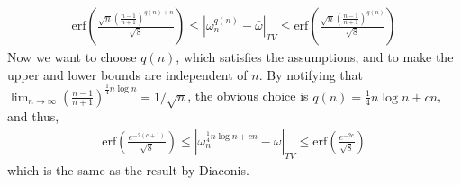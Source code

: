 \documentclass{article}
\begin{document}
\begin{eqnarray}
 \text{erf}\left(\frac{\sqrt{n}\left(\frac{n-1}{n+1} \right)^{q(n)+n}}{\sqrt{8}}\right) 
 \le |\omega_n^{q(n)}-\bar{\omega}|_{TV}
 \le \text{erf}\left(\frac{\sqrt{n}\left(\frac{n-1}{n+1} \right)^{q(n)}}{\sqrt{8}}\right)
\end{eqnarray}
Now we want to choose $q(n)$, which satisfies the assumptions, and to make the upper and lower bounds are independent of $n$. By notifying that $\lim_{n \rightarrow \infty} \left(\frac{n-1}{n+1} \right)^{\frac{1}{4}n\log{n}} =1/\sqrt{n} $, the obvious choice is $q(n)= \frac{1}{4}n\log{n}+cn$, and thus,
\begin{eqnarray}
 \text{erf}\left(\frac{e^{-2(c+1)}}{\sqrt{8}}\right) 
 \le |\omega_n^{\frac{1}{4}n\log{n}+cn}-\bar{\omega}|_{TV}
 \le \text{erf}\left(\frac{e^{-2c}}{\sqrt{8}}\right) 
\end{eqnarray}
which is the same as the result by Diaconis.  


\end{document}
